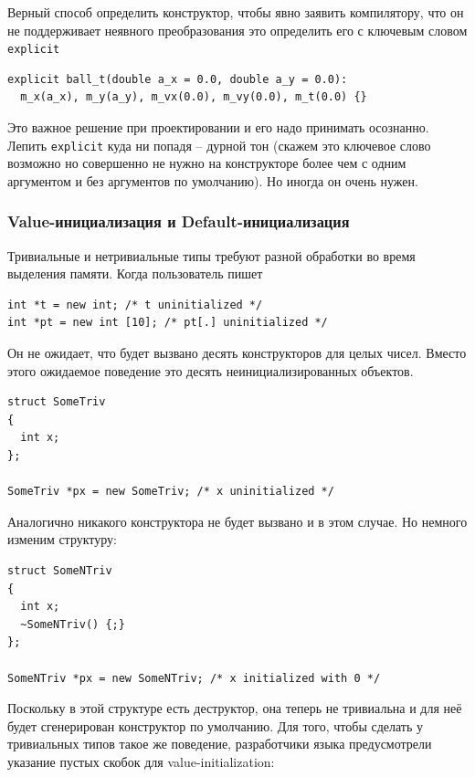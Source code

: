 \documentclass[a4paper,12pt,oneside]{article}
\begin{document}
Верный способ определить конструктор, чтобы явно заявить компилятору, что он не поддерживает неявного преобразования это определить его с ключевым словом \lstinline!explicit!

\begin{lstlisting}
explicit ball_t(double a_x = 0.0, double a_y = 0.0):
  m_x(a_x), m_y(a_y), m_vx(0.0), m_vy(0.0), m_t(0.0) {}
\end{lstlisting}

Это важное решение при проектировании и его надо принимать осознанно. Лепить \lstinline!explicit! куда ни попадя -- дурной тон (скажем это ключевое слово возможно но совершенно не нужно на конструкторе более чем с одним аргументом и без аргументов по умолчанию). Но иногда он очень нужен.

\subsubsection{Value-инициализация и Default-инициализация}\label{ValDefInit}

Тривиальные и нетривиальные типы требуют разной обработки во время выделения памяти. Когда пользователь пишет

\begin{lstlisting}
int *t = new int; /* t uninitialized */
int *pt = new int [10]; /* pt[.] uninitialized */
\end{lstlisting}

Он не ожидает, что будет вызвано десять конструкторов для целых чисел. Вместо этого ожидаемое поведение это десять неинициализированных объектов.

\begin{lstlisting}
struct SomeTriv
{
  int x;
};

SomeTriv *px = new SomeTriv; /* x uninitialized */
\end{lstlisting}

Аналогично никакого конструктора не будет вызвано и в этом случае. Но немного изменим структуру:

\begin{lstlisting}
struct SomeNTriv
{
  int x;
  ~SomeNTriv() {;}
};

SomeNTriv *px = new SomeNTriv; /* x initialized with 0 */
\end{lstlisting}

Поскольку в этой структуре есть деструктор, она теперь не тривиальна и для неё будет сгенерирован конструктор по умолчанию. Для того, чтобы сделать у тривиальных типов такое же поведение, разработчики языка предусмотрели указание пустых скобок для value-initialization:
\end{document}
